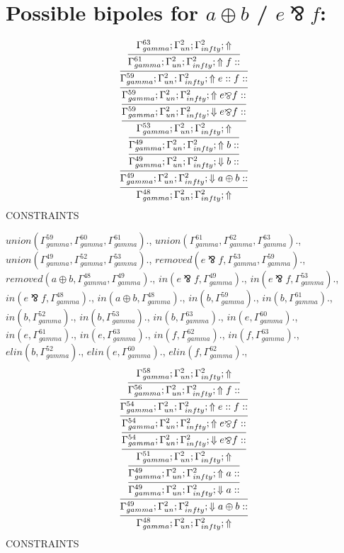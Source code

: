 \documentclass[a4paper, 11pt]{article}
\begin{document}
\section{Possible bipoles for $a \oplus b$ / $e \bindnasrepma f$:} 

{\small
\[
\infer{\Gamma_{ gamma}^{48} ; \Gamma_{un}^{2} ; \Gamma_{ infty}^{2} ;  \Uparrow }
{\infer{\Gamma_{ gamma}^{49} ; \Gamma_{un}^{2} ; \Gamma_{ infty}^{2} ;  \Downarrow a \oplus b :: }
{\infer{\Gamma_{ gamma}^{49} ; \Gamma_{un}^{2} ; \Gamma_{ infty}^{2} ;  \Downarrow b :: }
{\infer{\Gamma_{ gamma}^{49} ; \Gamma_{un}^{2} ; \Gamma_{ infty}^{2} ;  \Uparrow b :: }
{\infer{\Gamma_{ gamma}^{53} ; \Gamma_{un}^{2} ; \Gamma_{ infty}^{2} ;  \Uparrow }
{\infer{\Gamma_{ gamma}^{59} ; \Gamma_{un}^{2} ; \Gamma_{ infty}^{2} ;  \Downarrow e \bindnasrepma f :: }
{\infer{\Gamma_{ gamma}^{59} ; \Gamma_{un}^{2} ; \Gamma_{ infty}^{2} ;  \Uparrow e \bindnasrepma f :: }
{\infer{\Gamma_{ gamma}^{59} ; \Gamma_{un}^{2} ; \Gamma_{ infty}^{2} ;  \Uparrow e :: f :: }
{\infer{\Gamma_{ gamma}^{61} ; \Gamma_{un}^{2} ; \Gamma_{ infty}^{2} ;  \Uparrow f :: }
{\Gamma_{ gamma}^{63} ; \Gamma_{un}^{2} ; \Gamma_{ infty}^{2} ;  \Uparrow }}}}}}}}}
\]
}
CONSTRAINTS

$union(\Gamma_{gamma}^{59}, \Gamma_{gamma}^{60}, \Gamma_{gamma}^{61}).$, $union(\Gamma_{gamma}^{61}, \Gamma_{gamma}^{62}, \Gamma_{gamma}^{63}).$, $union(\Gamma_{gamma}^{49}, \Gamma_{gamma}^{52}, \Gamma_{gamma}^{53}).$, $removed(e \bindnasrepma f, \Gamma_{gamma}^{53}, \Gamma_{gamma}^{59}).$, $removed(a \oplus b, \Gamma_{gamma}^{48}, \Gamma_{gamma}^{49}).$, $in(e \bindnasrepma f, \Gamma_{gamma}^{49}).$, $in(e \bindnasrepma f, \Gamma_{gamma}^{53}).$, $in(e \bindnasrepma f, \Gamma_{gamma}^{48}).$, $in(a \oplus b, \Gamma_{gamma}^{48}).$, $in(b, \Gamma_{gamma}^{59}).$, $in(b, \Gamma_{gamma}^{61}).$, $in(b, \Gamma_{gamma}^{52}).$, $in(b, \Gamma_{gamma}^{53}).$, $in(b, \Gamma_{gamma}^{63}).$, $in(e, \Gamma_{gamma}^{60}).$, $in(e, \Gamma_{gamma}^{61}).$, $in(e, \Gamma_{gamma}^{63}).$, $in(f, \Gamma_{gamma}^{62}).$, $in(f, \Gamma_{gamma}^{63}).$, $elin(b, \Gamma_{gamma}^{52}).$, $elin(e, \Gamma_{gamma}^{60}).$, $elin(f, \Gamma_{gamma}^{62}).$, 
{\small
\[
\infer{\Gamma_{ gamma}^{48} ; \Gamma_{un}^{2} ; \Gamma_{ infty}^{2} ;  \Uparrow }
{\infer{\Gamma_{ gamma}^{49} ; \Gamma_{un}^{2} ; \Gamma_{ infty}^{2} ;  \Downarrow a \oplus b :: }
{\infer{\Gamma_{ gamma}^{49} ; \Gamma_{un}^{2} ; \Gamma_{ infty}^{2} ;  \Downarrow a :: }
{\infer{\Gamma_{ gamma}^{49} ; \Gamma_{un}^{2} ; \Gamma_{ infty}^{2} ;  \Uparrow a :: }
{\infer{\Gamma_{ gamma}^{51} ; \Gamma_{un}^{2} ; \Gamma_{ infty}^{2} ;  \Uparrow }
{\infer{\Gamma_{ gamma}^{54} ; \Gamma_{un}^{2} ; \Gamma_{ infty}^{2} ;  \Downarrow e \bindnasrepma f :: }
{\infer{\Gamma_{ gamma}^{54} ; \Gamma_{un}^{2} ; \Gamma_{ infty}^{2} ;  \Uparrow e \bindnasrepma f :: }
{\infer{\Gamma_{ gamma}^{54} ; \Gamma_{un}^{2} ; \Gamma_{ infty}^{2} ;  \Uparrow e :: f :: }
{\infer{\Gamma_{ gamma}^{56} ; \Gamma_{un}^{2} ; \Gamma_{ infty}^{2} ;  \Uparrow f :: }
{\Gamma_{ gamma}^{58} ; \Gamma_{un}^{2} ; \Gamma_{ infty}^{2} ;  \Uparrow }}}}}}}}}
\]
}
CONSTRAINTS
\end{document}
